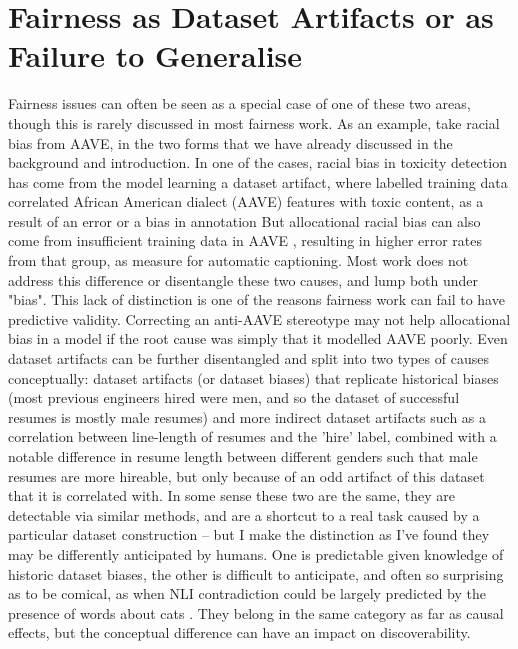 \section{Fairness as Dataset Artifacts or as Failure to Generalise}
\label{sec:fairness_as_other_fields}
Fairness issues can often be seen as a special case of one of these two areas, though this is rarely discussed in most fairness work. 
As an example, take racial bias from AAVE, in the two forms that we have already discussed in the background and introduction. In one of the cases, racial bias in toxicity detection has come from the model learning a dataset artifact, where labelled training data correlated African American dialect (AAVE) features with toxic content, as a result of an error or a bias in annotation \citep{sap-etal-2019-risk}
But allocational racial bias can also come from insufficient training data in AAVE , resulting in higher error rates from that group, as \citet{tatman17_interspeech} measure for automatic captioning. Most work does not address this difference or disentangle these two causes, and lump both under "bias". This lack of distinction is one of the reasons fairness work can fail to have predictive validity. Correcting an anti-AAVE stereotype may not help allocational bias in a model if the root cause was simply that it modelled AAVE poorly. Even dataset artifacts can be further disentangled and split into two types of causes conceptually: dataset artifacts (or dataset biases) that replicate historical biases (most previous engineers hired were men, and so the dataset of successful resumes is mostly male resumes) and more indirect dataset artifacts such as a correlation between line-length of resumes and the 'hire' label, combined with a notable difference in resume length between different genders such that male resumes are more hireable, but only because of an odd artifact of this dataset that it is correlated with. In some sense these two  are the same, they are detectable via similar methods, and are a shortcut to a real task caused by a particular dataset construction -- but I make the distinction as I've found they may be differently anticipated by humans. One is predictable given knowledge of historic dataset biases, the other is difficult to anticipate, and often so surprising as to be comical, as when NLI contradiction could be largely predicted by the presence of words about cats \citep{gururangan-etal-2018-annotation}. They belong in the same category as far as causal effects, but the conceptual difference can have an impact on discoverability.

